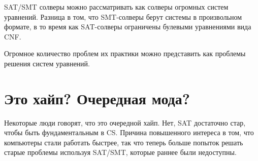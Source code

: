 \ac{SAT}/\ac{SMT} солверы можно рассматривать как солверы огромных систем уравнений.
Разница в том, что \ac{SMT}-солверы берут системы в произвольном формате,
в то время как \ac{SAT}-солверы ограничены булевыми уравнениями вида \ac{CNF}.

Огромное количество проблем их практики можно представить как проблемы решения систем уравнений.

\section{Это хайп? Очередная мода?}

Некоторые люди говорят, что это очередной хайп.
Нет, \ac{SAT} достаточно стар, чтобы быть фундаментальным в \ac{CS}.
Причина повышенного интереса в том, что компьютеры стали работать быстрее,
так что теперь больше попыток решать старые проблемы используя 
\ac{SAT}/\ac{SMT}, которые раннее были недоступны.

